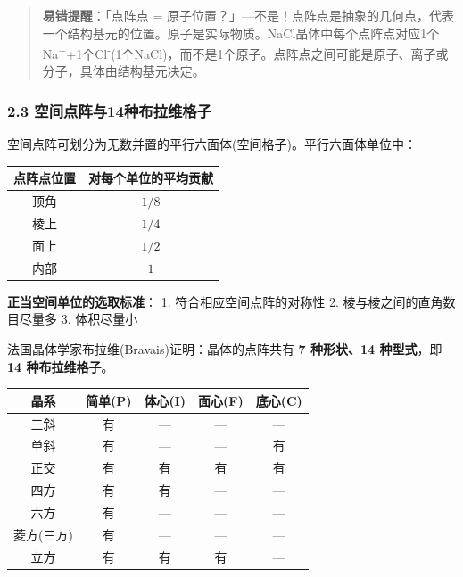 \documentclass[a4paper,11pt]{ctexart}
\newcounter{none}
\newcommand{\箭}{\ensuremath{\rightarrow}}
\newcommand{\左箭}{\ensuremath{\leftarrow}}
\newcommand{\上箭}{\ensuremath{\uparrow}}
\newcommand{\下箭}{\ensuremath{\downarrow}}
\newcommand{\衡}{\ensuremath{\rightleftharpoons}}
\newcommand{\双箭}{\ensuremath{\leftrightarrow}}
\newcommand{\约等于}{\ensuremath{\approx}}
\newcommand{\小于等于}{\ensuremath{\leq}}
\newcommand{\大于等于}{\ensuremath{\geq}}
\newcommand{\不等于}{\ensuremath{\neq}}
\newcommand{\西格马}{\ensuremath{\sigma}}
\newcommand{\派}{\ensuremath{\pi}}
\begin{document}
\begin{quote}
\textbf{易错提醒}：「点阵点 = 原子位置？」---不是！点阵点是抽象的几何点，代表一个结构基元的位置。原子是实际物质。NaCl晶体中每个点阵点对应1个Na\textsuperscript{+}+1个Cl\textsuperscript{-}(1个NaCl)，而不是1个原子。点阵点之间可能是原子、离子或分子，具体由结构基元决定。
\end{quote}

\subsubsection{2.3 空间点阵与14种布拉维格子}\label{ux7a7aux95f4ux70b9ux9635ux4e0e14ux79cdux5e03ux62c9ux7ef4ux683cux5b50}

空间点阵可划分为无数并置的平行六面体(空间格子)。平行六面体单位中：

{\def\LTcaptype{none} %
\begin{longtable}[]{@{}cc@{}}
\toprule\noalign{}
点阵点位置 & 对每个单位的平均贡献 \\
\midrule\noalign{}
\endhead
\bottomrule\noalign{}
\endlastfoot
顶角 & \(1/8\) \\
棱上 & \(1/4\) \\
面上 & \(1/2\) \\
内部 & \(1\) \\
\end{longtable}
}

\textbf{正当空间单位的选取标准}：
1. 符合相应空间点阵的对称性
2. 棱与棱之间的直角数目尽量多
3. 体积尽量小

法国晶体学家布拉维(Bravais)证明：晶体的点阵共有 \textbf{7 种形状、14 种型式}，即 \textbf{14 种布拉维格子}。

{\def\LTcaptype{none} %
\begin{longtable}[]{@{}ccccc@{}}
\toprule\noalign{}
晶系 & 简单(P) & 体心(I) & 面心(F) & 底心(C) \\
\midrule\noalign{}
\endhead
\bottomrule\noalign{}
\endlastfoot
三斜 & 有 & --- & --- & --- \\
单斜 & 有 & --- & --- & 有 \\
正交 & 有 & 有 & 有 & 有 \\
四方 & 有 & 有 & --- & --- \\
六方 & 有 & --- & --- & --- \\
菱方(三方) & 有 & --- & --- & --- \\
立方 & 有 & 有 & 有 & --- \\
\end{longtable}
}
\end{document}

